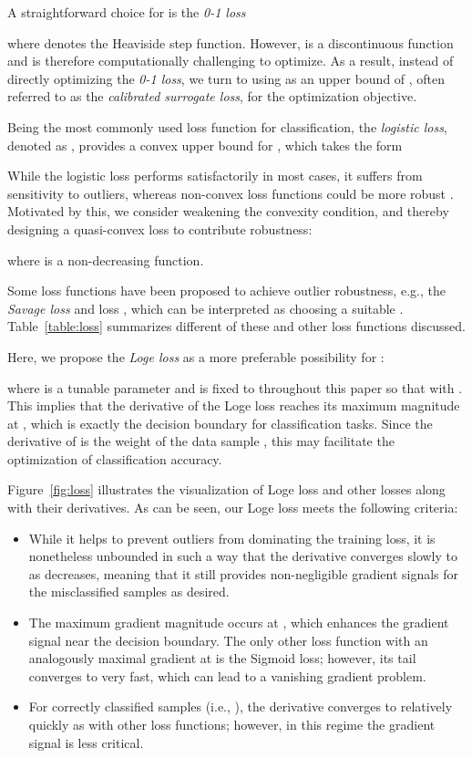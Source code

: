 \documentclass[sigconf,screen,nonacm]{acmart} \usepackage{booktabs}
\newcommand{\lossname}{{Loge }}
\begin{document}
	A straightforward choice for  is the \textit{0-1 loss}
	
	where  denotes the Heaviside step function.
	However,  is a discontinuous function and is therefore computationally challenging to optimize.
	As a result, instead of directly optimizing the \textit{0-1 loss}, we turn to using  as an upper bound of , often referred to as the \textit{calibrated surrogate loss}, for the optimization objective.
	
	Being the most commonly used loss function for classification, the \textit{logistic loss}, denoted as , provides a convex upper bound for , which takes the form
	
While the logistic loss performs satisfactorily in most cases, it suffers from sensitivity to outliers, whereas non-convex loss functions could be more robust \citep{masnadi2008design}. Motivated by this, we consider weakening the convexity condition, and thereby designing a quasi-convex loss to contribute robustness:
	
	where  is a non-decreasing function.
	
	Some loss functions have been proposed to achieve outlier robustness, e.g., the \textit{Savage loss} \citep{masnadi2008design} and  loss \citep{zhang2018generalized}, which can be interpreted as choosing a suitable .  Table~\ref{table:loss} summarizes different  of these and other loss functions discussed.
	
	Here, we propose the \textit{\lossname loss} as a more preferable possibility for :
	
	where  is a tunable parameter and is fixed to  throughout this paper so that  with .
	This implies that the derivative of the \lossname loss reaches its maximum magnitude at , which is exactly the decision boundary for classification tasks.
	Since the derivative of  is the weight of the data sample \citep{leistner2009robustness}, this may facilitate the optimization of classification accuracy.
	
	Figure~\ref{fig:loss} illustrates the visualization of \lossname loss and other losses along with their derivatives.
	As can be seen, our \lossname loss meets the following criteria:
	\begin{itemize}[topsep=3pt,leftmargin=10pt]
	\item While it helps to prevent outliers from dominating the training loss, it is nonetheless unbounded in such a way that the derivative converges slowly to  as  decreases, meaning that it still provides non-negligible gradient signals for the misclassified samples as desired.
	\item The maximum gradient magnitude occurs at , which enhances the gradient signal near the decision boundary. The only other loss function with an analogously maximal gradient at  is the Sigmoid loss; however, its tail converges to  very fast, which can lead to a vanishing gradient problem.
	\item For correctly classified samples (i.e., ), the derivative converges to  relatively quickly as with other loss functions; however, in this regime the gradient signal is less critical.
	\end{itemize}
\end{document}
